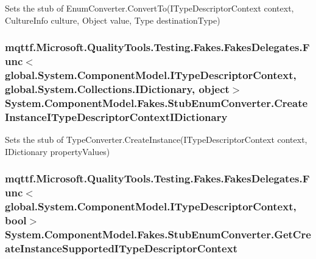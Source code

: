 Sets the stub of Enum\-Converter.\-Convert\-To(\-I\-Type\-Descriptor\-Context context, Culture\-Info culture, Object value, Type destination\-Type)

\hypertarget{class_system_1_1_component_model_1_1_fakes_1_1_stub_enum_converter_abbba5825c5be78e5c083f24132af7963}{
\subsubsection[{Create\-Instance\-I\-Type\-Descriptor\-Context\-I\-Dictionary}]{\setlength{\rightskip}{0pt plus 5cm}mqttf.\-Microsoft.\-Quality\-Tools.\-Testing.\-Fakes.\-Fakes\-Delegates.\-Func$<$global.\-System.\-Component\-Model.\-I\-Type\-Descriptor\-Context, global.\-System.\-Collections.\-I\-Dictionary, object$>$ System.\-Component\-Model.\-Fakes.\-Stub\-Enum\-Converter.\-Create\-Instance\-I\-Type\-Descriptor\-Context\-I\-Dictionary}}\label{class_system_1_1_component_model_1_1_fakes_1_1_stub_enum_converter_abbba5825c5be78e5c083f24132af7963}


Sets the stub of Type\-Converter.\-Create\-Instance(\-I\-Type\-Descriptor\-Context context, I\-Dictionary property\-Values)

\hypertarget{class_system_1_1_component_model_1_1_fakes_1_1_stub_enum_converter_afc5d6ec5b83f7066b13c6581a18805ee}{
\subsubsection[{Get\-Create\-Instance\-Supported\-I\-Type\-Descriptor\-Context}]{\setlength{\rightskip}{0pt plus 5cm}mqttf.\-Microsoft.\-Quality\-Tools.\-Testing.\-Fakes.\-Fakes\-Delegates.\-Func$<$global.\-System.\-Component\-Model.\-I\-Type\-Descriptor\-Context, bool$>$ System.\-Component\-Model.\-Fakes.\-Stub\-Enum\-Converter.\-Get\-Create\-Instance\-Supported\-I\-Type\-Descriptor\-Context}}\label{class_system_1_1_component_model_1_1_fakes_1_1_stub_enum_converter_afc5d6ec5b83f7066b13c6581a18805ee}


